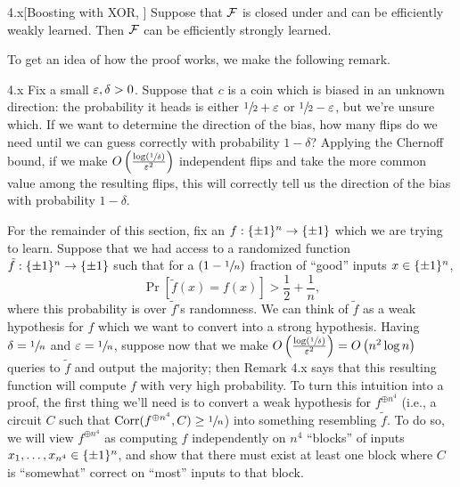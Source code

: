 \documentclass[11pt]{article}
\begin{document}
\begin{theorem}{4.x}[Boosting with XOR, \cite{BonehLipton}]
    Suppose that $\mathcal{F}$ is closed under \XOR{} and can be efficiently weakly learned. Then $\mathcal{F}$ can be efficiently strongly learned.
\end{theorem}

To get an idea of how the proof works, we make the following remark.

\begin{remark}{4.x}
    Fix a small $\varepsilon, \delta > 0$. Suppose that $c$ is a coin which is biased in an unknown direction: the probability it heads is either $\sfrac{1}{2} + \varepsilon$ or $\sfrac{1}{2} - \varepsilon$, but we're unsure which. If we want to determine the direction of the bias, how many flips do we need until we can guess correctly with probability $1 - \delta$? Applying the Chernoff bound, if we make $O\left(\frac{\log \left(\sfrac{1}{\delta}\right)}{\varepsilon^2}\right)$ independent flips and take the more common value among the resulting flips, this will correctly tell us the direction of the bias with probability $1 - \delta$.
\end{remark}

For the remainder of this section, fix an $f : \{\pm 1\}^n \rightarrow \{\pm 1\}$ which we are trying to learn. Suppose that we had access to a randomized function $\tilde{f} : \{\pm 1\}^n \rightarrow \{\pm 1\}$ such that for a $(1 - \sfrac{1}{n})$ fraction of ``good'' inputs $x \in \{\pm 1\}^n$, 
\begin{equation*}
    \Pr[\tilde{f}(x) = f(x)] > \frac{1}{2} + \frac{1}{n},
\end{equation*}
where this probability is over $\tilde{f}$'s randomness. We can think of $\tilde{f}$ as a weak hypothesis for $f$ which we want to convert into a strong hypothesis. Having $\delta = \sfrac{1}{n}$ and $\varepsilon = \sfrac{1}{n}$, suppose now that we make $O\left(\frac{\log (\sfrac{1}{\delta})}{\varepsilon^2}\right) = O\left(n^2 \log n\right)$ queries to $\tilde{f}$ and output the majority; then Remark 4.x says that this resulting function will compute $f$ with very high probability. To turn this intuition into a proof, the first thing we'll need is to convert a weak hypothesis for $f^{\oplus n^4}$ (i.e., a circuit $C$ such that $\mathrm{Corr}(f^{\oplus n^4}, C) \geq \sfrac{1}{n}$) into something resembling $\tilde{f}$. To do so, we will view $f^{\oplus n^4}$ as computing $f$ independently on $n^4$ ``blocks'' of inputs $x_1, \ldots, x_{n^4} \in \{\pm 1\}^n$, and show that there must exist at least one block where $C$ is ``somewhat'' correct on ``most'' inputs to that block.
\end{document}
